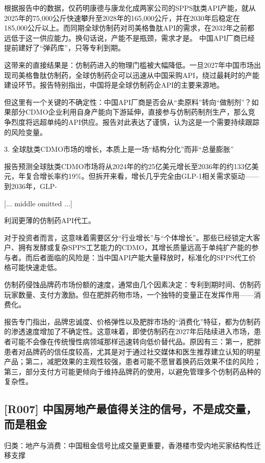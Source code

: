 \documentclass[11pt]{ctexart}
\begin{document}
根据报告中的数据，仅药明康德与康龙化成两家公司的SPPS肽类API产能，就从2025年的75,000公斤快速攀升至2028年的165,000公斤，并在2030年后稳定在185,000公斤以上。而同期全球仿制药对司美格鲁肽API的需求，在2032年之前都远低于这一供应能力。换句话说，产能不是瓶颈，需求才是。 中国API厂商已经提前建好了“弹药库”，只等专利到期。

这带来的直接结果是：仿制药进入的物理门槛被大幅降低。一旦2027年中国市场出现司美格鲁肽仿制药，全球仿制药企可以迅速从中国采购API，绕过最耗时的产能建设环节。报告特别指出，中国将是全球仿制药企API的主要来源地。

但这里有一个关键的不确定性：中国API厂商是否会从“卖原料”转向“做制剂”？如果部分CDMO企业利用自身产能向下游延伸，直接参与仿制药制剂生产，那么竞争烈度将远超单纯的API供应。报告对此表达了谨慎，认为这是一个需要持续跟踪的风险变量。

3. 全球肽类CDMO市场的增长，本质上是一场“结构分化”而非“总量膨胀”

报告预测全球肽类CDMO市场将从2024年的约25亿美元增长至2036年的约133亿美元，年复合增长率约19\%。但拆开来看，增长几乎完全由GLP-1相关需求驱动——到2036年，GLP-

[... middle omitted ...]

利润更薄的仿制药API代工。

对于投资者而言，这意味着需要区分“行业增长”与“个体增长”。那些已经锁定大客户、拥有发酵或复杂SPPS工艺能力的CDMO，其增长质量远高于单纯扩产能的参与者。而后者面临的风险是：当中国API产能大量释放时，标准化的SPPS代工价格可能快速走低。

仿制药侵蚀品牌药市场份额的速度，通常由几个因素决定：专利到期时间、仿制药玩家数量、支付方激励。但在肥胖药物市场，一个独特的变量正在发挥作用——消费化。

报告专门指出，品牌忠诚度、价格弹性以及肥胖市场的“消费化”特征，都为仿制药的渗透速度增加了不确定性。这意味着，即使仿制药在2027年后陆续进入市场，患者可能不会像在传统慢性病领域那样迅速转向低价替代品。原因有三：第一，肥胖患者对品牌药的信任度较高，尤其是对于通过社交媒体和医生推荐建立认知的明星产品；第二，减肥效果的主观性较强，患者可能不愿冒着换药后效果不佳的风险；第三，部分支付方可能更倾向于维持品牌药的使用，以避免管理多个仿制药品种的复杂性。

\subsection{[R007] 中国房地产最值得关注的信号，不是成交量，而是租金}
{\small\color{refgray}归类：地产与消费：中国租金信号比成交量更重要，香港楼市受内地买家结构性迁移支撑}
\end{document}
